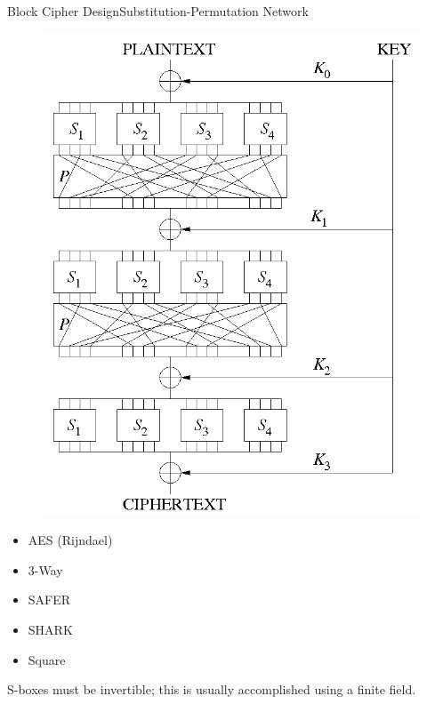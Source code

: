 \documentclass[12pt]{beamer}
\begin{document}
\begin{frame}{Block Cipher Design}{Substitution-Permutation Network}
	\centering
	\begin{minipage}{0.45\textwidth}
		\begin{figure}[h!]
			\centering
			\includegraphics[width=\textwidth,height=0.8\textheight,keepaspectratio]{pictures/spn}
		\end{figure}
	\end{minipage}
	\begin{minipage}{0.45\textwidth}
		\begin{itemize}
			\item AES (Rijndael)
			\item 3-Way
			\item SAFER
			\item SHARK
			\item Square
		\end{itemize}

		S-boxes must be invertible; this is usually accomplished using a finite
		field.
	\end{minipage}
\end{frame}
\end{document}
